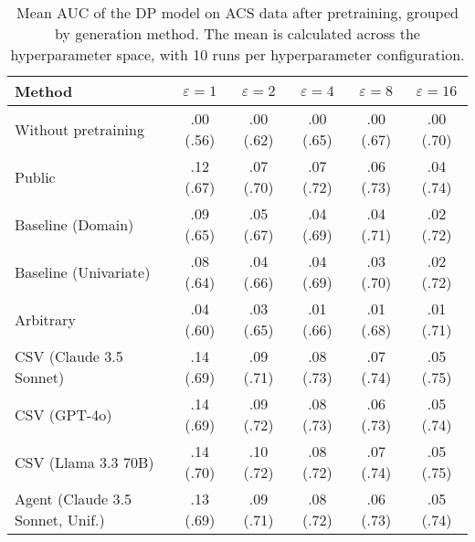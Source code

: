 \begin{table}[h!]
    \centering
    \caption{Mean AUC of the DP model on ACS data after pretraining, grouped by generation method. The mean is calculated across the hyperparameter space, with 10 runs per hyperparameter configuration.}
    \label{tab:epsilon_comparison}
    \begin{tabular}{lccccc}
    \toprule
    Method & $\varepsilon=1$ & $\varepsilon=2$ & $\varepsilon=4$ & $\varepsilon=8$ & $\varepsilon=16$ \\
    \midrule
    Without pretraining & .00 {\small (.56)} & .00 {\small (.62)} & .00 {\small (.65)} & .00 {\small (.67)} & .00 {\small (.70)} \\
    \arrayrulecolor{black!50!}\midrule
    Public & .12 {\small (.67)} & .07 {\small (.70)} & .07 {\small (.72)} & .06 {\small (.73)} & .04 {\small (.74)} \\
    \arrayrulecolor{black!50!}\midrule
    Baseline (Domain) & .09 {\small (.65)} & .05 {\small (.67)} & .04 {\small (.69)} & .04 {\small (.71)} & .02 {\small (.72)} \\
    Baseline (Univariate) & .08 {\small (.64)} & .04 {\small (.66)} & .04 {\small (.69)} & .03 {\small (.70)} & .02 {\small (.72)} \\
    \arrayrulecolor{black!50!}\midrule
    Arbitrary & .04 {\small (.60)} & .03 {\small (.65)} & .01 {\small (.66)} & .01 {\small (.68)} & .01 {\small (.71)} \\
    \arrayrulecolor{black!50!}\midrule
    CSV (Claude 3.5 Sonnet) & \cellcolor{bronze!30}.14 {\small (.69)} & \cellcolor{bronze!30}.09 {\small (.71)} & \cellcolor{gold!30}.08 {\small (.73)} & \cellcolor{silver!30}.07 {\small (.74)} & \cellcolor{gold!30}.05 {\small (.75)} \\
    CSV (GPT-4o) & \cellcolor{silver!30}.14 {\small (.69)} & \cellcolor{silver!30}.09 {\small (.72)} & \cellcolor{silver!30}.08 {\small (.73)} & \cellcolor{bronze!30}.06 {\small (.73)} & \cellcolor{bronze!30}.05 {\small (.74)} \\
    CSV (Llama 3.3 70B) & \cellcolor{gold!30}.14 {\small (.70)} & \cellcolor{gold!30}.10 {\small (.72)} & \cellcolor{silver!30}.08 {\small (.72)} & \cellcolor{gold!30}.07 {\small (.74)} & \cellcolor{silver!30}.05 {\small (.75)} \\
    \arrayrulecolor{black!50!}\midrule
    Agent (Claude 3.5 Sonnet, Unif.) & .13 {\small (.69)} & .09 {\small (.71)} & \cellcolor{silver!30}.08 {\small (.72)} & .06 {\small (.73)} & .05 {\small (.74)} \\

\end{tabular}
\end{table}
